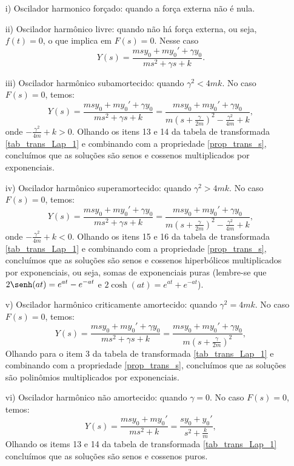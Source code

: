 \begin{itemize}
 \item[i)] Oscilador harmonico forçado: quando a força externa não é nula.
 \item[ii)] Oscilador harmônico livre: quando não há força externa, ou seja, $f(t)=0$, o que implica em $F(s)=0$. Nesse caso
\begin{equation}
Y(s)=\frac{msy_0+my_0'+\gamma y_0}{ms^2+\gamma s +k}.
\end{equation}
\item[iii)] Oscilador harmônico subamortecido: quando $\gamma^2< 4mk$. No caso $F(s)=0$, temos:
\begin{equation}
Y(s)=\frac{msy_0+my_0'+\gamma y_0}{ms^2+\gamma s +k}=\frac{msy_0+my_0'+\gamma y_0}{m\left(s+\frac{\gamma}{2m}\right)^2-\frac{\gamma^2}{4m} +k},
\end{equation}
onde $-\frac{\gamma^2}{4m} +k>0$. Olhando os itens 13 e 14 da tabela de transformada \ref{tab_trans_Lap_1} e combinando com a propriedade \ref{prop_trans_s}, concluímos que as soluções são senos e cossenos multiplicados por exponenciais.
\item[iv)] Oscilador harmônico superamortecido: quando $\gamma^2> 4mk$. No caso $F(s)=0$, temos:
\begin{equation}
Y(s)=\frac{msy_0+my_0'+\gamma y_0}{ms^2+\gamma s +k}=\frac{msy_0+my_0'+\gamma y_0}{m\left(s+\frac{\gamma}{2m}\right)^2-\frac{\gamma^2}{4m} +k},
\end{equation}
onde $-\frac{\gamma^2}{4m} +k<0$. Olhando os itens 15 e 16 da tabela de transformada \ref{tab_trans_Lap_1} e combinando com a propriedade \ref{prop_trans_s}, concluímos que as soluções são senos e cossenos hiperbólicos multiplicados por exponenciais, ou seja, somas de exponenciais puras (lembre-se que $\displaystyle 2\senh(at)=e^{at}-e^{-at}$ e $\displaystyle2\cosh(at)=e^{at}+e^{-at}$).
\item[v)] Oscilador harmônico criticamente amortecido: quando $\gamma^2= 4mk$. No caso $F(s)=0$, temos:
\begin{equation}
Y(s)=\frac{msy_0+my_0'+\gamma y_0}{ms^2+\gamma s +k}=\frac{msy_0+my_0'+\gamma y_0}{m\left(s+\frac{\gamma}{2m}\right)^2},
\end{equation}
Olhando para o item 3 da tabela de transformada \ref{tab_trans_Lap_1} e combinando com a propriedade \ref{prop_trans_s}, concluímos que as soluções são polinômios multiplicados por exponenciais.
\item[vi)] Oscilador harmônico não amortecido: quando $\gamma= 0$. No caso $F(s)=0$, temos:
\begin{equation}
Y(s)=\frac{msy_0+my_0'}{ms^2 +k}=\frac{sy_0+y_0'}{s^2+\frac{k}{m}},
\end{equation}
Olhando os items 13 e 14 da tabela de transformada \ref{tab_trans_Lap_1} concluímos que as soluções são senos e cossenos puros.
\end{itemize}
